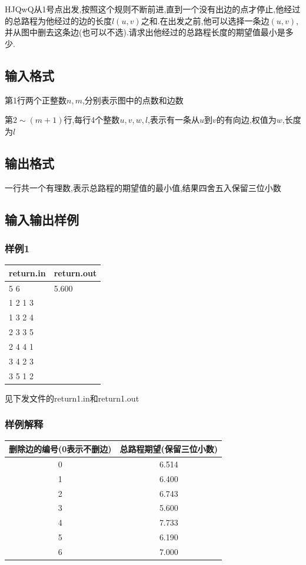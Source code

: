 \documentclass[12pt]{ctexart}
\begin{document}
HJQwQ从1号点出发,按照这个规则不断前进,直到一个没有出边的点才停止,他经过的总路程为他经过的边的长度$l(u,v)$之和.在出发之前,他可以选择一条边$(u,v)$,并从图中删去这条边(也可以不选).请求出他经过的总路程长度的期望值最小是多少.
\subsection{输入格式}
第1行两个正整数$n,m$,分别表示图中的点数和边数

第$2\sim(m+1)$行,每行4个整数$u,v,w,l$,表示有一条从$u$到$v$的有向边,权值为$w$,长度为$l$
\subsection{输出格式}
一行共一个有理数,表示总路程的期望值的最小值,结果四舍五入保留三位小数
\subsection{输入输出样例}
\subsubsection{样例1}
\begin{center}
	\begin{tabular}{|p{6cm}|p{6cm}|}
		\hline return.in&return.out\\
		\hline	5 6&5.600\\
				1 2 1 3&\\
				1 3 2 4&\\
				2 3 3 5&\\
				2 4 4 1&\\
				3 4 2 3&\\
				3 5 1 2&\\
		\hline
	\end{tabular}
\end{center}
见下发文件的return1.in和return1.out
\subsubsection{样例解释}
\begin{center}
	\begin{tabular}{|c|c|}
		\hline 删除边的编号(0表示不删边)&总路程期望(保留三位小数)\\
		\hline 0&6.514\\
		\hline 1&6.400\\
		\hline 2&6.743\\
		\hline 3&5.600\\
		\hline 4&7.733\\
		\hline 5&6.190\\
		\hline 6&7.000\\
		\hline
	\end{tabular}
\end{center}
\end{document}
